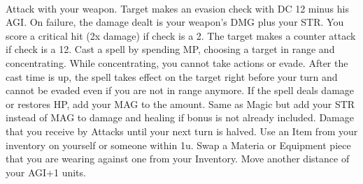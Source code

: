 \documentclass[a4paper, titlepage, 11pt, twocolumn] {article}
\begin{document}
{	%
	\begin{multicols}{2}
	\columnbreak
	\end{multicols}
	{\vspace*{-0.4cm}\ofcsrulea}\vspace*{-0.9cm}\\
	\begin{multicols}{2}
	\hspace*{-0.3cm}
	\parbox{1.03\columnwidth}{
		\scriptsize
		\hfill{}\hfill\ofrow
		\oficonsmallattack{} Attack with your weapon.
		Target makes an evasion check with DC 12 minus his AGI.
		On failure, the damage dealt is your weapon's DMG plus your STR.
		You score a critical hit (2x damage) if check is a 2.
		The target makes a counter attack if check is a 12.\ofrow
		\oficonsmallmagic{} Cast a spell by spending MP, choosing a target in range and concentrating.
		While concentrating, you cannot take actions or evade. 
		After the cast time is up, the spell takes effect on the target right before your turn and cannot be evaded even if you are not in range anymore.
		If the spell deals damage or restores HP, add your MAG to the amount.\ofrow
		\oficonsmalltech{}
		Same as Magic but add your STR instead of MAG to damage and healing if bonus is not already included.\ofrow
		\oficonsmalldefend{} Damage that you receive by Attacks until your next turn is halved. \ofrow
		\oficonsmallitem{} Use an Item from your inventory on yourself or someone within 1u.\ofrow
		\oficonsmallreequip{} Swap a Materia or Equipment piece that you are wearing against one from your Inventory.\ofrow
		\oficonsmalldash{} Move another distance of your AGI+1 units.
}
\end{multicols}}
\end{document}
